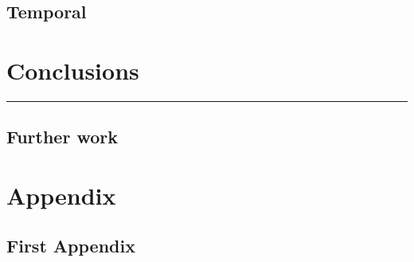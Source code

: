 \documentclass[a4paper,12pt,twoside,notitlepage]{report}
\newcommand{\rulewidth}{300pt}
\newcommand{\halfrule}{
  \begin{center}
    {\rule{\rulewidth}{0.5pt}}
  \end{center}}
\begin{document}
\section{Temporal}

\chapter{Conclusions}

\halfrule

\section{Further work}


\begin{thebibliography}{}
\end{thebibliography}


\appendix
\chapter*{Appendix}

\section{First Appendix}
\end{document}
